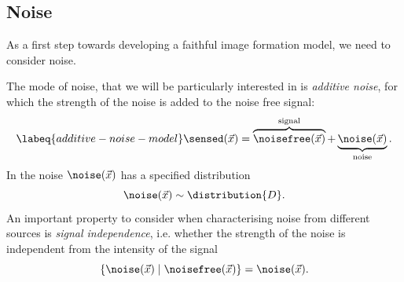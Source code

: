 \begin{marginfigure}[*-14]
\caption{Sum of the illumination pattern intensity along the wave vector for the first orientation, results in a uniform 
    intensity.}
\end{marginfigure}




\subsection{Noise}%

As a first step towards developing a faithful image formation model, we need to consider noise.

The mode of noise, that we will be particularly interested in is \emph{additive noise}, for which the strength of the 
    noise is added to the noise free signal:
\begin{equation} \labeq{additive-noise-model}
    \sensed(\vec{x}) = \overbrace{\noisefree(\vec{x})}^{\text{signal}} + \underbrace{\noise(\vec{x})}_{\text{noise}}.
\end{equation}
In  the noise \(\noise(\vec{x})\) has a specified distribution
\begin{equation*}
    \noise(\vec{x}) \sim \distribution{D}.
\end{equation*}
An important property to consider when characterising noise from different sources is \emph{signal independence}, i.e. 
    whether the strength of the noise is independent from the intensity of the signal
\begin{equation*}
    \left\{ \noise(\vec{x}) \mid \noisefree(\vec{x})  \right\} = \noise(\vec{x}).
\end{equation*}

